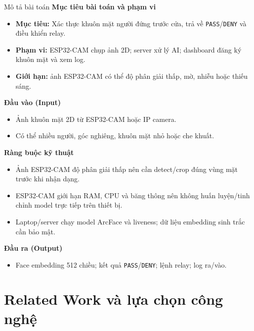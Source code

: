 \documentclass[aspectratio=169]{beamer}
\begin{document}
\begin{frame}[t]{Mô tả bài toán}
  \footnotesize
  \textbf{Mục tiêu bài toán và phạm vi}
  \begin{itemize}\setlength{\itemsep}{0pt}
    \item \textbf{Mục tiêu:} Xác thực khuôn mặt người đứng trước cửa, trả về \texttt{PASS}/\texttt{DENY} và điều khiển relay.
    \item \textbf{Phạm vi:} ESP32-CAM chụp ảnh 2D; server xử lý AI; dashboard đăng ký khuôn mặt và xem log.
    \item \textbf{Giới hạn:} ảnh ESP32-CAM có thể độ phân giải thấp, mờ, nhiễu hoặc thiếu sáng.
  \end{itemize}

  \vspace{0.2em}
  \textbf{Đầu vào (Input)}
  \begin{itemize}\setlength{\itemsep}{0pt}
    \item Ảnh khuôn mặt 2D từ ESP32-CAM hoặc IP camera.
    \item Có thể nhiều người, góc nghiêng, khuôn mặt nhỏ hoặc che khuất.
  \end{itemize}

  \vspace{0.2em}
  \textbf{Ràng buộc kỹ thuật}
  \begin{itemize}\setlength{\itemsep}{0pt}
    \item Ảnh ESP32-CAM độ phân giải thấp nên cần detect/crop đúng vùng mặt trước khi nhận dạng.
    \item ESP32-CAM giới hạn RAM, CPU và băng thông nên không huấn luyện/tinh chỉnh model trực tiếp trên thiết bị.
    \item Laptop/server chạy model ArcFace và liveness; dữ liệu embedding sinh trắc cần bảo mật.
  \end{itemize}

  \vspace{0.2em}
  \textbf{Đầu ra (Output)}
  \begin{itemize}\setlength{\itemsep}{0pt}
    \item Face embedding 512 chiều; kết quả \texttt{PASS}/\texttt{DENY}; lệnh relay; log ra/vào.
  \end{itemize}
\end{frame}

\section{Related Work và lựa chọn công nghệ}
\end{document}
